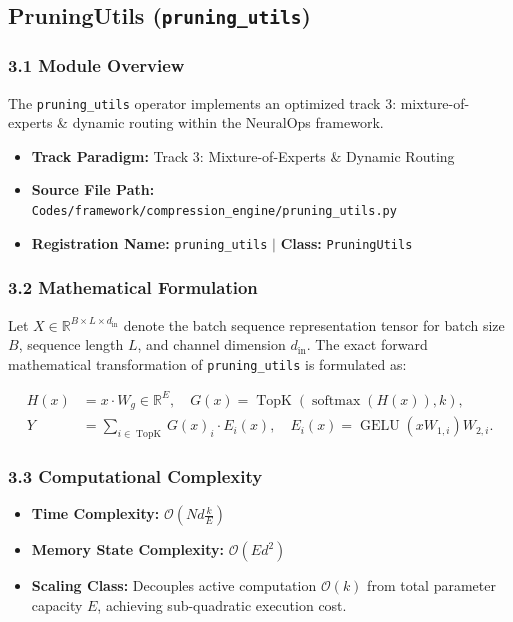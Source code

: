 \subsection{PruningUtils (\texttt{pruning\_utils})}
\label{sec:app_module_pruning\_utils}

\subsubsection*{3.1 Module Overview}
The \texttt{pruning\_utils} operator implements an optimized track 3: mixture-of-experts \& dynamic routing within the NeuralOps framework.
\begin{itemize}
    \item \textbf{Track Paradigm:} Track 3: Mixture-of-Experts & Dynamic Routing
    \item \textbf{Source File Path:} \texttt{Codes/framework/compression\_engine/pruning\_utils.py}
    \item \textbf{Registration Name:} \texttt{pruning\_utils} $\mid$ \textbf{Class:} \texttt{PruningUtils}
\end{itemize}

\subsubsection*{3.2 Mathematical Formulation}
Let $X \in \mathbb{R}^{B \times L \times d_{\text{in}}}$ denote the batch sequence representation tensor for batch size $B$, sequence length $L$, and channel dimension $d_{\text{in}}$. The exact forward mathematical transformation of \texttt{pruning\_utils} is formulated as:

\begin{align}
H(x) &= x \cdot W_g \in \mathbb{R}^{E}, \quad G(x) = \operatorname{TopK}\left(\operatorname{softmax}(H(x)), k\right), \\
Y &= \sum_{i \in \operatorname{TopK}} G(x)_i \cdot E_i(x), \quad E_i(x) = \operatorname{GELU}(x W_{1, i}) W_{2, i}.
\end{align}


\subsubsection*{3.3 Computational Complexity}
\begin{itemize}
    \item \textbf{Time Complexity:} $\mathcal{O}(N d \frac{k}{E})$
    \item \textbf{Memory State Complexity:} $\mathcal{O}(E d^2)$
    \item \textbf{Scaling Class:} Decouples active computation $\mathcal{O}(k)$ from total parameter capacity $E$, achieving sub-quadratic execution cost.
\end{itemize}

